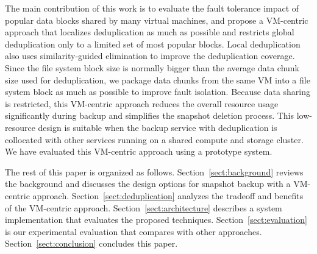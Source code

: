 The main contribution of this work is to evaluate the fault tolerance  impact of popular data blocks shared by many
virtual machines, and   propose a VM-centric approach that localizes deduplication as much as possible 
and restricts global deduplication only to a limited set of most popular blocks.
Local deduplication also uses similarity-guided elimination to improve the deduplication coverage.
Since the file system block size is normally bigger than the average data chunk size used for deduplication,
we package data chunks from the same VM into a file system block as much as possible to improve fault isolation.
Because data sharing is restricted, 
this VM-centric approach reduces the overall resource usage significantly during backup and
simplifies the snapshot deletion process. This low-resource design
is suitable when the backup service with deduplication is collocated with other services running on a shared compute and storage
cluster.  We have evaluated this VM-centric approach using  a prototype system.




The rest of this paper is organized as follows.
Section~\ref{sect:background} reviews the background and discusses the  design options for snapshot backup 
with a VM-centric approach. 
Section~\ref{sect:deduplication}  analyzes the tradeoff and benefits of the VM-centric approach. 
Section~\ref{sect:architecture}  describes a system implementation that evaluates the proposed techniques.
Section~\ref{sect:evaluation} is our experimental evaluation that compares with other approaches.
Section~\ref{sect:conclusion}  concludes this paper.
